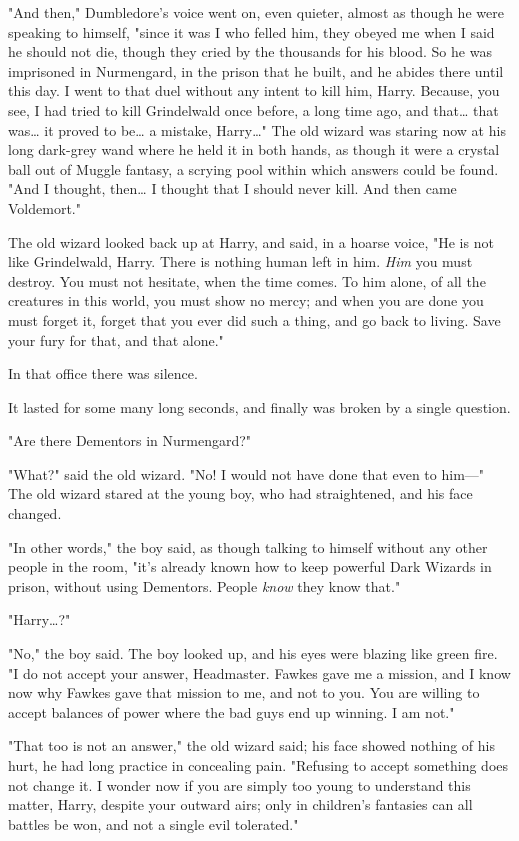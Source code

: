 "And then," Dumbledore's voice went on, even quieter, almost as though he were
speaking to himself, "since it was I who felled him, they obeyed me when I said
he should not die, though they cried by the thousands for his blood. So he was
imprisoned in Nurmengard, in the prison that he built, and he abides there
until this day. I went to that duel without any intent to kill him, Harry.
Because, you see, I had tried to kill Grindelwald once before, a long time ago,
and that{\ldots} that was{\ldots} it proved to be{\ldots} a mistake,
Harry{\ldots}" The old wizard was staring now at his long dark-grey wand where
he held it in both hands, as though it were a crystal ball out of Muggle
fantasy, a scrying pool within which answers could be found. "And I thought,
then{\ldots} I thought that I should never kill. And then came Voldemort."

The old wizard looked back up at Harry, and said, in a hoarse voice, "He is not
like Grindelwald, Harry. There is nothing human left in him. \emph{Him} you
must destroy. You must not hesitate, when the time comes. To him alone, of all
the creatures in this world, you must show no mercy; and when you are done you
must forget it, forget that you ever did such a thing, and go back to living.
Save your fury for that, and that alone."

In that office there was silence.

It lasted for some many long seconds, and finally was broken by a single
question.

"Are there Dementors in Nurmengard?"

"What?" said the old wizard. "No! I would not have done that even to him---"
\later
The old wizard stared at the young boy, who had straightened, and his face
changed.

"In other words," the boy said, as though talking to himself without any other
people in the room, "it's already known how to keep powerful Dark Wizards in
prison, without using Dementors. People \emph{know} they know that."

"Harry{\ldots}?"

"No," the boy said. The boy looked up, and his eyes were blazing like green
fire. "I do not accept your answer, Headmaster. Fawkes gave me a mission, and I
know now why Fawkes gave that mission to me, and not to you. You are willing to
accept balances of power where the bad guys end up winning. I am not."

"That too is not an answer," the old wizard said; his face showed nothing of
his hurt, he had long practice in concealing pain. "Refusing to accept
something does not change it. I wonder now if you are simply too young to
understand this matter, Harry, despite your outward airs; only in children's
fantasies can all battles be won, and not a single evil tolerated."

